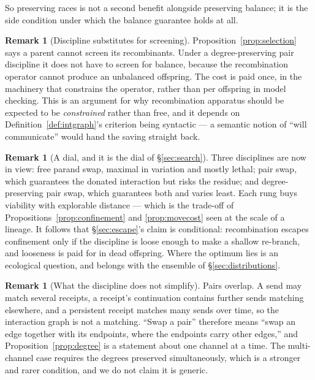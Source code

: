\documentclass[11pt]{article}
\theoremstyle{plain}
\theoremstyle{definition}
\newtheorem{remark}[theorem]{Remark}
\begin{document}
So preserving races is not a second benefit alongside preserving balance; it is the side condition
under which the balance guarantee holds at all.

\begin{remark}[Discipline substitutes for screening]
\label{rem:discipline}
Proposition~\ref{prop:selection} says a parent cannot screen its recombinants. Under a
degree-preserving pair discipline it does not have to screen for balance, because the recombination
operator cannot produce an unbalanced offspring. The cost is paid once, in the machinery that
constrains the operator, rather than per offspring in model checking. This is an argument for why
recombination apparatus should be expected to be \emph{constrained} rather than free, and it depends
on Definition~\ref{def:intgraph}'s criterion being syntactic --- a semantic notion of ``will
communicate'' would hand the saving straight back.
\end{remark}

\begin{remark}[A dial, and it is the dial of \S\ref{sec:search}]
\label{rem:dial}
Three disciplines are now in view: free parand swap, maximal in variation and mostly lethal; pair
swap, which guarantees the donated interaction but risks the residue; and degree-preserving pair swap,
which guarantees both and varies least. Each rung buys viability with explorable distance --- which is
the trade-off of Propositions~\ref{prop:confinement} and \ref{prop:movecost} seen at the scale of a
lineage. It follows that \S\ref{sec:escape}'s claim is conditional: recombination escapes confinement
only if the discipline is loose enough to make a shallow re-branch, and looseness is paid for in dead
offspring. Where the optimum lies is an ecological question, and belongs with the ensemble of
\S\ref{sec:distributions}.
\end{remark}

\begin{remark}[What the discipline does not simplify]
\label{rem:overlap}
Pairs overlap. A send may match several receipts, a receipt's continuation contains further sends
matching elsewhere, and a persistent receipt matches many sends over time, so the interaction graph is
not a matching. ``Swap a pair'' therefore means ``swap an edge together with its endpoints, where the
endpoints carry other edges,'' and Proposition~\ref{prop:degree} is a statement about one channel at a
time. The multi-channel case requires the degrees preserved simultaneously, which is a stronger and
rarer condition, and we do not claim it is generic.
\end{remark}
\end{document}
